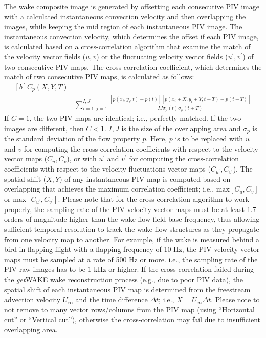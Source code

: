 \documentclass[12pt,a4paper]{article}
\begin{document}
The wake composite image is generated by offsetting each consecutive PIV image with a calculated instantaneous convection velocity and then overlapping the images, while keeping the mid region of each instantaneous PIV image. 
The instantaneous convection velocity, which determines the offset if each PIV image, is calculated based on a cross-correlation algorithm that examine the match of the velocity vector fields ($u,v$) or the fluctuating velocity vector fields ($u^{\prime},v^{\prime}$) of two consecutive PIV maps.
The cross-correlation coefficient, which determines the match of two consecutive PIV maps, is calculated as follows:
\begin{equation}
\begin{aligned}[b]
C_p(X,Y,T)&=    \\
&\sum_{i=1,j=1}^{I,J} \frac{\left[ p(x_i,y_i,t) - \overline{p(t)} \right] \left[ p(x_i+X,y_i+Y,t+T) - \overline{p(t+T)} \right]}{IJ\sigma_p(t)\sigma_p(t+T)}
\label{eq:Cp}
\end{aligned}
\end{equation}
If $C=1$, the two PIV maps are identical; i.e., perfectly matched. If the two images are different, then $C<1$.
$I,J$ is the size of the overlapping area and $\sigma_p$ is the standard deviation of the flow property $p$. Here, $p$ is to be replaced with $u$ and $v$ for computing the cross-correlation coefficients with respect to the velocity vector maps ($C_u,C_v$), or with $u^{\prime}$ and $v^{\prime}$ for computing the cross-correlation coefficients with respect to the velocity fluctuations vector maps ($C_{u^{\prime}},C_{v^{\prime}}$).
The spatial shift ($X,Y$) of any instantaneous PIV map is computed based on overlapping that achieves the maximum correlation coefficient; i.e., $\mathrm{max}\left[C_u,C_v\right]$ or $\mathrm{max}\left[C_{u^\prime},C_{v^\prime}\right]$.
Please note that for the cross-correlation algorithm to work properly, the sampling rate of the PIV velocity vector maps must be at least 1.7 orders-of-magnitude higher than the wake flow field base frequency, thus allowing sufficient temporal resolution to track the wake flow structures as they propagate from one velocity map to another. For example, if the wake is measured behind a bird in flapping flight with a flapping frequency of 10 $\mathrm{Hz}$, the PIV velocity vector maps must be sampled at a rate of 500 $\mathrm{Hz}$ or more. i.e., the sampling rate of the PIV raw images has to be 1 $\mathrm{kHz}$ or higher.
If the cross-correlation failed during the \textit{get}WAKE wake reconstruction process (e.g., due to poor PIV data), the spatial shift of each instantaneous PIV map is determined from the freestream advection velocity $U_\infty$ and the time difference $\Delta t$; i.e., $X=U_\infty\Delta t$.
Please note to not remove to many vector rows/columns from the PIV map (using ``Horizontal cut'' or ``Vertical cut''), otherwise the cross-correlation may fail due to insufficient overlapping area.
\end{document}
